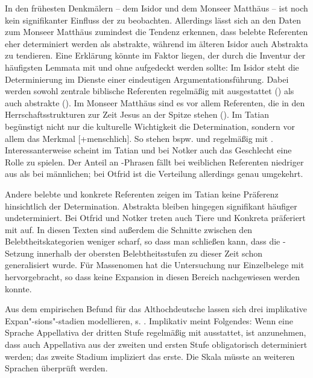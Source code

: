 In den frühesten Denkmälern -- dem Isidor und dem Monseer Matthäus -- ist noch kein signifikanter Einfluss der  zu beobachten. Allerdings lässt sich an den Daten zum Monseer Matthäus zumindest die Tendenz erkennen, dass belebte Referenten eher determiniert werden als abstrakte, während im älteren Isidor auch Abstrakta  zu  tendieren. Eine Erklärung könnte im Faktor  liegen, der durch die Inventur der häufigsten Lemmata  mit und ohne  aufgedeckt werden sollte:  Im Isidor steht die Determinierung im Dienste einer eindeutigen Argumentationsführung. Dabei werden sowohl zentrale biblische Referenten regelmäßig mit  ausgestattet () als auch abstrakte (). Im Monseer Matthäus sind es vor allem Referenten, die in den Herrschaftsstrukturen zur Zeit Jesus an der Spitze stehen (). Im Tatian begünstigt nicht nur die kulturelle Wichtigkeit die Determination, sondern vor allem das Merkmal [+menschlich]. So stehen bspw.  und  regelmäßig mit . Interessanterweise scheint im Tatian und bei Notker auch das Geschlecht eine Rolle zu spielen. Der Anteil an -Phrasen fällt bei weiblichen Referenten niedriger aus als bei männlichen; bei Otfrid ist die Verteilung allerdings genau umgekehrt.

Andere belebte  und konkrete  Referenten zeigen im Tatian keine Präferenz hinsichtlich der Determination. Abstrakta  bleiben hingegen signifikant häufiger undeterminiert. Bei Otfrid und Notker treten auch Tiere und Konkreta  präferiert mit  auf. In diesen Texten sind außerdem die Schnitte zwischen den Belebtheitskategorien  weniger scharf, so dass man schließen kann, dass die -Setzung innerhalb der obersten Belebtheitsstufen  zu dieser Zeit schon generalisiert wurde. Für Massenomen hat die Untersuchung nur Einzelbelege mit  hervorgebracht, so dass keine Expansion  in diesen Bereich nachgewiesen werden konnte.  

Aus dem empirischen Befund für das Althochdeutsche lassen sich drei implikative Expan"-sions"-stadien  modellieren, s.  
 . Implikativ meint Folgendes:  
Wenn eine Sprache Appellativa  der dritten Stufe regelmäßig mit  ausstattet, ist anzunehmen, dass auch Appellativa  aus der zweiten und ersten Stufe obligatorisch determiniert werden; das zweite Stadium impliziert das erste. Die Skala müsste an weiteren Sprachen überprüft werden.  

